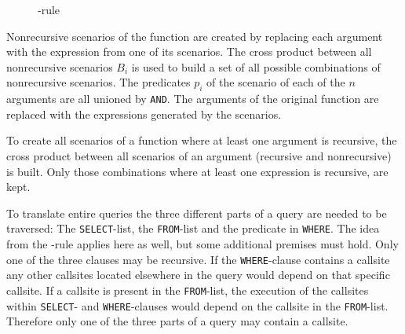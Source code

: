 \begin{figure}[h!]
    \centering
    \caption{\REXPR-rule}
    \label{rule:expr}
\end{figure}

Nonrecursive scenarios of the function are created by replacing each argument with the expression from one of its scenarios. The cross product between all nonrecursive scenarios $B_i$ is used to build a set of all possible combinations of nonrecursive scenarios. The predicates $p_i$ of the scenario of each of the $n$ arguments are all unioned by \texttt{AND}. The arguments of the original function are replaced with the expressions generated by the scenarios.

To create all scenarios of a function where at least one argument is recursive, the cross product between all scenarios of an argument (recursive and nonrecursive) is built. Only those combinations where at least one expression is recursive, are kept.

To translate entire queries the three different parts of a query are needed to be traversed: The \texttt{SELECT}-list, the \texttt{FROM}-list and the predicate in \texttt{WHERE}. The idea from the \REXPR-rule applies here as well, but some additional premises must hold. Only one of the three clauses may be recursive. If the \texttt{WHERE}-clause contains a callsite any other callsites located elsewhere in the query would depend on that specific callsite. If a callsite is present in the \texttt{FROM}-list, the execution of the callsites within \texttt{SELECT}- and \texttt{WHERE}-clauses would depend on the callsite in the \texttt{FROM}-list. Therefore only one of the three parts of a query may contain a callsite.

